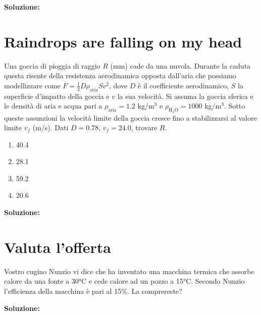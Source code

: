 \noindent \textbf{Soluzione:}


\section{Raindrops are falling on my head}
Una goccia di pioggia di raggio $R$ (mm)
cade da una nuvola. Durante la caduta
questa risente della resistenza aerodinamica
opposta dall'aria che possiamo modellizzare
come $F = \frac12 D \rho_\text{aria} S v^2$,
dove $D$ è il coefficiente aerodinamico,
$S$ la superficie d'impatto della goccia e
$v$ la sua velocità. Si assuma la goccia
sferica e le densità di aria e acqua pari a
$\rho_\text{aria} = 1.2$ kg/m$^3$ e
$\rho_\text{H$_2$O} = 1000$ kg/m$^3$. Sotto
queste assunzioni la velocità limite della
goccia cresce fino a stabilizzarsi al
valore limite $v_f$ (m/s). Dati $D = 0.78$,
$v_f = 24.0$, trovare $R$.

\begin{enumerate}
    \item 40.4
    \item 28.1
    \item 59.2
    \item 20.6
\end{enumerate}

\noindent \textbf{Soluzione:}

\section{Valuta l'offerta}
Vostro cugino Nunzio vi dice che ha inventato una macchina termica che assorbe
calore da una fonte a 30°C e cede calore ad un pozzo a 15°C. Secondo Nunzio
l'efficienza della macchina è pari al 15\%. La comprereste?

\noindent \textbf{Soluzione:}